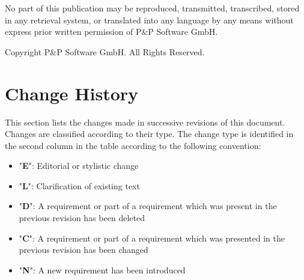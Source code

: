 \documentclass[a4paper,10pt]{article}
\let\stdsection\section
\renewcommand\section{\newpage\stdsection}
\begin{document}
\newpage
\tableofcontents

\newpage
\listoffigures
\listoftables
\lstlistoflistings


\newpage
\vspace*{\fill}
\begin{center}
No part of this publication may be reproduced, transmitted, transcribed, stored in any retrieval system, or translated into any language
by any means without express prior written permission of P\&P Software GmbH.
\end{center}

\begin{center}
Copyright  P\&P Software GmbH. All Rights Reserved. 
\end{center}
\vspace*{\fill}

\setlength{\parskip}{3mm}						%


\section{Change History}

This section lists the changes made in successive revisions of this document. Changes are classified according to their type. The change type is identified in the second column in the table according to the following convention:

\begin{itemize}[itemsep=0mm]
\item "\textbf{E}": Editorial or stylistic change
\item "\textbf{L}": Clarification of existing text
\item "\textbf{D}": A requirement or part of a requirement which was present in the previous revision has been deleted
\item "\textbf{C}": A requirement or part of a requirement which was presented in the previous revision has been changed
\item "\textbf{N}": A new requirement has been introduced
\end{itemize}
\end{document}
